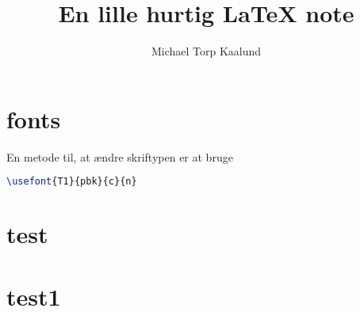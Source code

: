 \documentclass[10pt,a4paper]{report}
\title{En lille hurtig \LaTeX{} note}
\author{Michael Torp Kaalund}
\begin{document}
    \begin{titlepage}
        \maketitle
    \end{titlepage}


    \tableofcontents

    \chapter{fonts}
    En metode til, at ændre skriftypen er at bruge 
    \begin{lstlisting}[language=TeX]
        \usefont{T1}{pbk}{c}{n}
    \end{lstlisting}


    
    
    
    
    
    
    
    
    
    
    
    
    
    
    
    
    
    
    
    
    

    \appendix
    \chapter{test}

    \chapter{test1}

    
\end{document}
